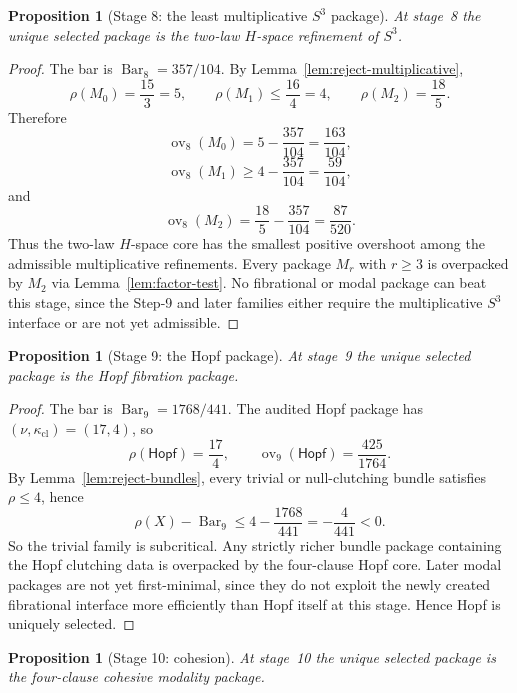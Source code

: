 \documentclass{lmcs}
\theoremstyle{plain}
\newtheorem{prop}[thm]{Proposition}
\theoremstyle{definition}
\theoremstyle{remark}
\newcommand{\SelBar}{\ensuremath{\operatorname{Bar}}}
\newcommand{\ov}{\ensuremath{\operatorname{ov}}}
\begin{document}
\begin{prop}[Stage 8: the least multiplicative $S^3$ package]
\label{prop:appendix-stage8}
At stage~8 the unique selected package is the two-law $H$-space refinement of $S^3$.
\end{prop}

\begin{proof}
The bar is $\SelBar_8=357/104$.
By Lemma~\ref{lem:reject-multiplicative},
\[
  \rho(M_0)=\frac{15}{3}=5,\qquad
  \rho(M_1)\le \frac{16}{4}=4,\qquad
  \rho(M_2)=\frac{18}{5}.
\]
Therefore
\[
  \ov_8(M_0)=5-\frac{357}{104}=\frac{163}{104},
\]
\[
  \ov_8(M_1)\ge 4-\frac{357}{104}=\frac{59}{104},
\]
and
\[
  \ov_8(M_2)=\frac{18}{5}-\frac{357}{104}=\frac{87}{520}.
\]
Thus the two-law $H$-space core has the smallest positive overshoot among the admissible multiplicative refinements.
Every package $M_r$ with $r\ge 3$ is overpacked by $M_2$ via Lemma~\ref{lem:factor-test}.
No fibrational or modal package can beat this stage, since the Step-9 and later families either require the multiplicative $S^3$ interface or are not yet admissible.
\end{proof}

\begin{prop}[Stage 9: the Hopf package]
\label{prop:appendix-stage9}
At stage~9 the unique selected package is the Hopf fibration package.
\end{prop}

\begin{proof}
The bar is $\SelBar_9=1768/441$.
The audited Hopf package has $(\nu,\kappa_{\mathrm{cl}})=(17,4)$, so
\[
  \rho(\mathsf{Hopf})=\frac{17}{4},\qquad
  \ov_9(\mathsf{Hopf})=\frac{425}{1764}.
\]
By Lemma~\ref{lem:reject-bundles}, every trivial or null-clutching bundle satisfies $\rho\le 4$, hence
\[
  \rho(X)-\SelBar_9\le 4-\frac{1768}{441}=-\frac{4}{441}<0.
\]
So the trivial family is subcritical.
Any strictly richer bundle package containing the Hopf clutching data is overpacked by the four-clause Hopf core.
Later modal packages are not yet first-minimal, since they do not exploit the newly created fibrational interface more efficiently than Hopf itself at this stage.
Hence Hopf is uniquely selected.
\end{proof}

\begin{prop}[Stage 10: cohesion]
\label{prop:appendix-stage10}
At stage~10 the unique selected package is the four-clause cohesive modality package.
\end{prop}
\end{document}
